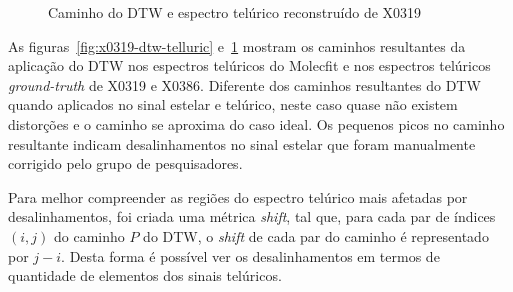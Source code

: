 \begin{figure}[H]
  \centering
  \hfill
  \caption{Caminho do DTW e espectro telúrico reconstruído de X0319}
  \label{fig:x0386-dtw-telluric}
\end{figure}

As figuras~\ref{fig:x0319-dtw-telluric} e~\ref{fig:x0386-dtw-telluric} mostram os caminhos resultantes da aplicação do DTW nos espectros telúricos do Molecfit e nos espectros telúricos \textit{ground-truth} de X0319 e X0386. Diferente dos caminhos resultantes do DTW quando aplicados no sinal estelar e telúrico, neste caso quase não existem distorções e o caminho se aproxima do caso ideal. Os pequenos picos no caminho resultante indicam desalinhamentos no sinal estelar que foram manualmente corrigido pelo grupo de pesquisadores. 

Para melhor compreender as regiões do espectro telúrico mais afetadas por desalinhamentos, foi criada uma métrica \textit{shift}, tal que, para cada par de índices $(i,j)$ do caminho $P$ do DTW, o \textit{shift} de cada par do caminho é representado por $j - i$. Desta forma é possível ver os desalinhamentos em termos de quantidade de elementos dos sinais telúricos.

